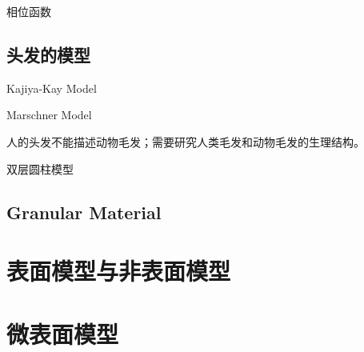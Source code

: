 相位函数

\subsection*{头发的模型}

Kajiya-Kay Model

Marschner Model

人的头发不能描述动物毛发；需要研究人类毛发和动物毛发的生理结构。

双层圆柱模型

\subsection*{Granular Material}

\section{表面模型与非表面模型}

\section{微表面模型}